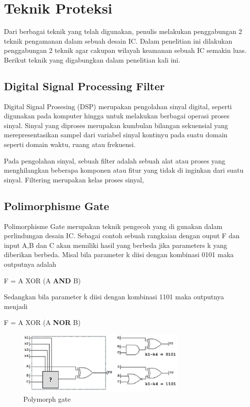 \section{Teknik Proteksi}
Dari berbagai teknik yang telah digunakan, penulis melakukan penggabungan 2 teknik pengamanan dalam sebuah desain IC. Dalam penelitian ini dilakukan penggabungan 2 teknik agar cakupan wilayah keamanan sebuah IC semakin luas. Berikut teknik yang digabungkan dalam penelitian kali ini.

\subsection{Digital Signal Processing Filter}
Digital Signal Prosesing (DSP) merupakan pengolahan sinyal digital, seperti digunakan pada komputer hingga untuk melakukan berbagai operasi proses sinyal. Sinyal yang diproses merupakan kumbulan bilangan sekuensial yang merepresentasikan sampel dari variabel sinyal kontinyu pada suatu domain seperti domain waktu, ruang atau frekuensi.

Pada pengolahan sinyal, sebuah filter adalah sebuah alat atau proses yang menghilangkan beberapa komponen atau fitur yang tidak di inginkan dari suatu sinyal. Filtering merupakan kelas proses sinyal, 

\subsection{Polimorphisme Gate}
Polimorphisme Gate merupakan teknik pengecoh yang di gunakan dalam perlindungan desain IC. Sebagai contoh sebuah rangkaian dengan ouput F dan input A,B dan C akan memiliki hasil yang berbeda jika parameters k yang diberikan berbeda. Misal bila parameter k diisi dengan kombinasi 0101 maka outputnya adalah
\begin{center}
	F = A XOR (A \textbf{AND} B)
\end{center}
Sedangkan bila parameter k diisi dengan kombinasi 1101 maka outputnya menjadi
\begin{center}
	F = A XOR (A \textbf{NOR} B)
\end{center}

\begin{figure}
	\centering
	\includegraphics[width=0.75\textwidth]
	{pics/polymorphgate.png}
	\caption{Polymorph gate}
	\label{fig:poly}
\end{figure}

